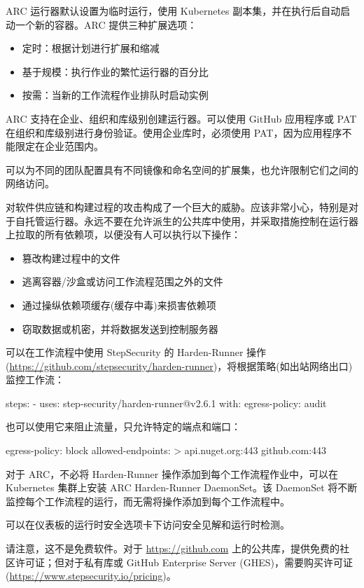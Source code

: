 
ARC 运行器默认设置为临时运行，使用 Kubernetes 副本集，并在执行后自动启动一个新的容器。ARC 提供三种扩展选项：

\begin{itemize}
\item 
定时：根据计划进行扩展和缩减

\item 
基于规模：执行作业的繁忙运行器的百分比

\item 
按需：当新的工作流程作业排队时启动实例
\end{itemize}

ARC 支持在企业、组织和库级别创建运行器。可以使用 GitHub 应用程序或 PAT 在组织和库级别进行身份验证。使用企业库时，必须使用 PAT，因为应用程序不能限定在企业范围内。

可以为不同的团队配置具有不同镜像和命名空间的扩展集，也允许限制它们之间的网络访问。


对软件供应链和构建过程的攻击构成了一个巨大的威胁。应该非常小心，特别是对于自托管运行器。永远不要在允许派生的公共库中使用，并采取措施控制在运行器上拉取的所有依赖项，以便没有人可以执行以下操作：

\begin{itemize}
\item 
篡改构建过程中的文件

\item 
逃离容器/沙盒或访问工作流程范围之外的文件

\item 
通过操纵依赖项缓存(缓存中毒)来损害依赖项

\item 
窃取数据或机密，并将数据发送到控制服务器
\end{itemize}

可以在工作流程中使用 StepSecurity 的 Harden-Runner 操作(\url{https://github.com/stepsecurity/harden-runner})，将根据策略(如出站网络出口)监控工作流：

\begin{shell}
steps:
  - uses: step-security/harden-runner@v2.6.1
    with:
      egress-policy: audit
\end{shell}

也可以使用它来阻止流量，只允许特定的端点和端口：

\begin{shell}
egress-policy: block
allowed-endpoints: >
  api.nuget.org:443
  github.com:443
\end{shell}

对于 ARC，不必将 Harden-Runner 操作添加到每个工作流程作业中，可以在 Kubernetes 集群上安装 ARC Harden-Runner DaemonSet。该 DaemonSet 将不断监控每个工作流程的运行，而无需将操作添加到每个工作流程中。

可以在仪表板的运行时安全选项卡下访问安全见解和运行时检测。

请注意，这不是免费软件。对于 \url{https://github.com} 上的公共库，提供免费的社区许可证；但对于私有库或 GitHub Enterprise Server (GHES)，需要购买许可证(\url{https://www.stepsecurity.io/pricing})。



